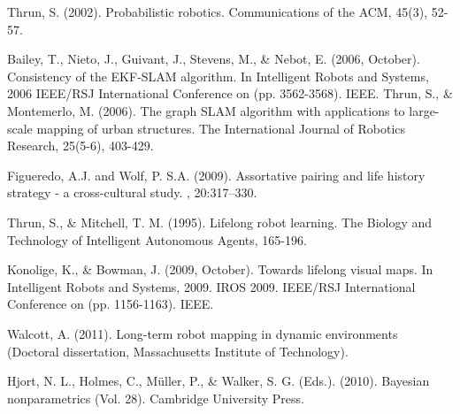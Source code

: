 \documentclass[]{article}
\begin{document}
    \begin{thebibliography}{99} %

            \newblock Thrun, S. (2002). Probabilistic robotics. Communications of the ACM, 45(3), 52-57.


         \newblock Bailey, T., Nieto, J., Guivant, J., Stevens, M., \& Nebot, E. (2006, October). Consistency of the EKF-SLAM algorithm. In Intelligent Robots and Systems, 2006 IEEE/RSJ International Conference on (pp. 3562-3568). IEEE.  
            \newblock Thrun, S., \& Montemerlo, M. (2006). The graph SLAM algorithm with applications to large-scale mapping of urban structures. The International Journal of Robotics Research, 25(5-6), 403-429.

            Figueredo, A.J. and Wolf, P. S.A. (2009).
            \newblock Assortative pairing and life history strategy - a cross-cultural
            study.
            , 20:317--330.

            \newblock Thrun, S., \& Mitchell, T. M. (1995). Lifelong robot learning. The Biology and Technology of Intelligent Autonomous Agents, 165-196.

            \newblock Konolige, K., \& Bowman, J. (2009, October). Towards lifelong visual maps. In Intelligent Robots and Systems, 2009. IROS 2009. IEEE/RSJ International Conference on (pp. 1156-1163). IEEE.

            \newblock Walcott, A. (2011). Long-term robot mapping in dynamic environments (Doctoral dissertation, Massachusetts Institute of Technology).

            \newblock Hjort, N. L., Holmes, C., Müller, P., \& Walker, S. G. (Eds.). (2010). Bayesian nonparametrics (Vol. 28). Cambridge University Press.





\end{thebibliography}
\end{document}

